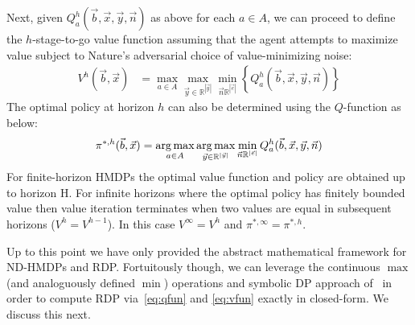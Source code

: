 Next, given $Q_a^h(\vec{b},\vec{x},\vec{y},\vec{n})$ as above for each
$a \in A$, we can proceed to define the $h$-stage-to-go value function
assuming that the agent attempts to maximize value subject to Nature's
adversarial choice of value-minimizing noise:
\vspace{-2mm}
{\footnotesize
\begin{align}
V^{h}(\vec{b},\vec{x}) & = \max_{a \in A} \max_{\vec{y} \in \mathbb{R}^{|\vec{y}|}} \min_{\vec{n} \mathbb{R}^{|\vec{e}|}} \left\{ Q^{h}_a(\vec{b},\vec{x},\vec{y},\vec{n}) \right\} \label{eq:vfun}
\end{align}}
The optimal policy at horizon $h$ can also be determined using the
$Q$-function as below:
{\footnotesize
\begin{align}
\pi^{*,h}(\vec{b},\vec{x}) = \argmax_{a \in A}  \argmax_{\vec{y} \in \mathbb{R}^{|\vec{y}|}}  \min_{\vec{n} \mathbb{R}^{|\vec{e}|}}  Q^h_a(\vec{b},\vec{x},\vec{y},\vec{n})
\end{align}}
For finite-horizon HMDPs the optimal value function and policy are
obtained up to horizon H.  For infinite horizons where the optimal policy
has finitely bounded value then value iteration terminates when two
values are equal in subsequent horizons ($V^{h} = V^{h-1}$). In this
case $V^\infty = V^h$ and $\pi^{*,\infty} = \pi^{*,h}$.
 
Up to this point we have only provided the abstract mathematical
framework for ND-HMDPs and RDP.  Fortuitously though, we can leverage
the continuous $\max$ (and analoguously defined $\min$) operations and
symbolic DP approach of~\cite{sdp_aaai} in order to compute RDP 
via~\eqref{eq:qfun} and \eqref{eq:vfun} exactly in closed-form.  We
discuss this next.
